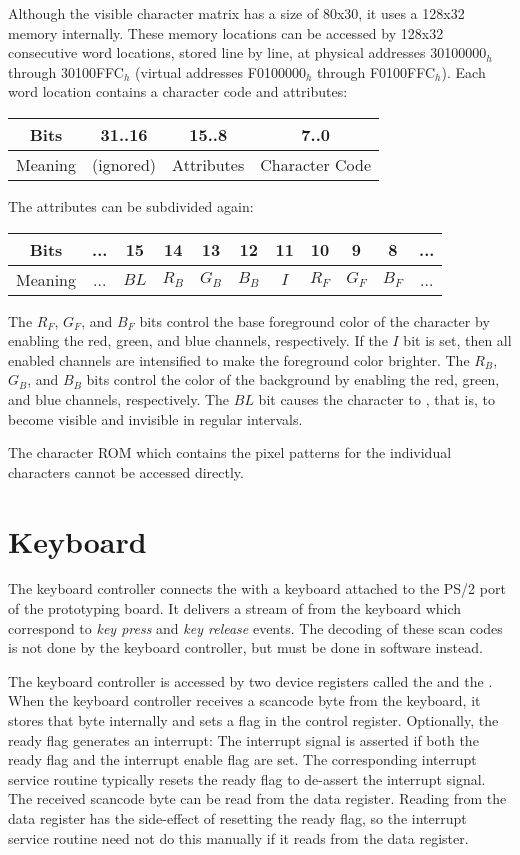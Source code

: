 Although the visible character matrix has a size of 80x30, it uses a 128x32 memory internally. These memory locations can be accessed by 128x32 consecutive word locations, stored line by line, at physical addresses 30100000$_h$ through 30100FFC$_h$ (virtual addresses F0100000$_h$ through F0100FFC$_h$). Each word location contains a character code and attributes:

\begin{tabular}{|c|c|c|c|}
\hline
Bits & 31..16 & 15..8 & 7..0\\
\hline
Meaning & (ignored) & Attributes & Character Code\\
\hline
\end{tabular}

The attributes can be subdivided again:

\begin{tabular}{|c|c|c|c|c|c|c|c|c|c|c|}
\hline
Bits & ... & 15 & 14 & 13 & 12 & 11 & 10 & 9 & 8 & ...\\
\hline
Meaning & ... & $BL$ & $R_B$ & $G_B$ & $B_B$ & $I$ & $R_F$ & $G_F$ & $B_F$ & ...\\
\hline
\end{tabular}

The $R_F$, $G_F$, and $B_F$ bits control the base foreground color of the character by enabling the red, green, and blue channels, respectively. If the $I$ bit is set, then all enabled channels are intensified to make the foreground color brighter. The $R_B$, $G_B$, and $B_B$ bits control the color of the background by enabling the red, green, and blue channels, respectively. The $BL$ bit causes the character to , that is, to become visible and invisible in regular intervals.

The character ROM which contains the pixel patterns for the individual characters cannot be accessed directly.

\section{Keyboard}

The keyboard controller connects the \eco with a keyboard attached to the PS/2 port of the prototyping board. It delivers a stream of  from the keyboard which correspond to {\it key press} and {\it key release} events. The decoding of these scan codes is not done by the keyboard controller, but must be done in software instead.

The keyboard controller is accessed by two device registers called the  and the . When the keyboard controller receives a scancode byte from the keyboard, it stores that byte internally and sets a  flag in the control register. Optionally, the ready flag generates an interrupt: The interrupt signal is asserted if both the ready flag and the interrupt enable flag are set. The corresponding interrupt service routine typically resets the ready flag to de-assert the interrupt signal. The received scancode byte can be read from the data register. Reading from the data register has the side-effect of resetting the ready flag, so the interrupt service routine need not do this manually if it reads from the data register.

